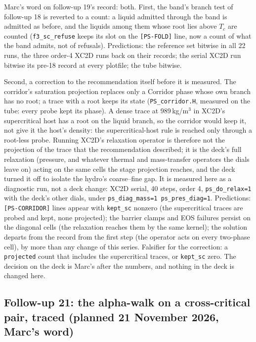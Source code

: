 \documentclass[11pt,a4paper]{article}
\newcommand{\code}[1]{\texttt{\small #1}}
\begin{document}
Marc's word on follow-up 19's record: both.  First, the band's branch
test of follow-up 18 is reverted to a count: a liquid admitted through
the band is admitted as before, and the liquids among them whose root
lies above $T_c$ are counted (\code{f3\_sc\_refuse} keeps its slot on
the \code{[PS-FOLD]} line, now a count of what the band admits, not of
refusals).  Predictions: the reference set bitwise in all 22 runs, the
three order-4 XC2D runs back on their records; the serial XC2D run
bitwise its pre-18 record at every plotfile; the tube bitwise.

Second, a correction to the recommendation itself before it is
measured.  The corridor's saturation projection replaces only a
Corridor phase whose own branch has no root; a trace with a root keeps
its state (\code{PS\_corridor.H}, measured on the tube: every probe kept
its phase).  A dense trace at 989\,kg/m$^3$ in XC2D's supercritical
host has a root on the liquid branch, so the corridor would keep it,
not give it the host's density: the supercritical-host rule is reached
only through a root-less probe.  Running XC2D's relaxation operator is
therefore not the projection of the trace that the recommendation
described; it is the deck's full relaxation (pressure, and whatever
thermal and mass-transfer operators the dials leave on) acting on the
same cells the stage projection reaches, and the deck turned it off to
isolate the hydro's coarse--fine gap.  It is measured here as a
diagnostic run, not a deck change: XC2D serial, 40 steps, order 4,
\code{ps\_do\_relax=1} with the deck's other dials, under
\code{ps\_diag\_mass=1 ps\_pres\_diag=1}.  Predictions:
\code{[PS-CORRIDOR]} lines appear with \code{kept\_sc} nonzero (the
supercritical traces are probed and kept, none projected); the barrier
clamps and EOS failures persist on the diagonal cells (the relaxation
reaches them by the same kernel); the solution departs from the record
from the first step (the operator acts on every two-phase cell), by
more than any change of this series.  Falsifier for the correction: a
\code{projected} count that includes the supercritical traces, or
\code{kept\_sc} zero.  The decision on the deck is Marc's after the
numbers, and nothing in the deck is changed here.

\subsection*{Follow-up 21: the alpha-walk on a cross-critical pair, traced (planned 21 November 2026, Marc's word)}
\end{document}

